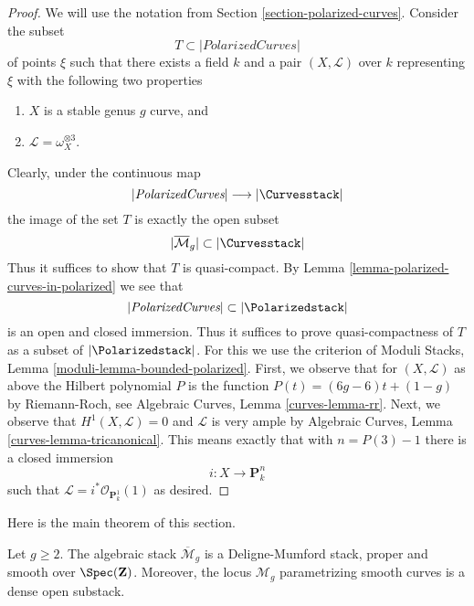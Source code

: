 \begin{proof}
We will use the notation from Section \ref{section-polarized-curves}.
Consider the subset
$$
T \subset |\textit{PolarizedCurves}|
$$
of points $\xi$ such that there exists a field $k$ and a pair
$(X, \mathcal{L})$ over $k$ representing $\xi$
with the following two properties
\begin{enumerate}
\item $X$ is a stable genus $g$ curve, and
\item $\mathcal{L} = \omega_X^{\otimes 3}$.
\end{enumerate}
Clearly, under the continuous map
$$
|\textit{PolarizedCurves}|
\longrightarrow
|\Curvesstack|
$$
the image of the set $T$ is exactly the open subset
$$
|\overline{\mathcal{M}}_g| \subset |\Curvesstack|
$$
Thus it suffices to show that $T$ is quasi-compact.
By Lemma \ref{lemma-polarized-curves-in-polarized} we see that
$$
|\textit{PolarizedCurves}| \subset |\Polarizedstack|
$$
is an open and closed immersion. Thus it suffices to
prove quasi-compactness of $T$ as a subset of
$|\Polarizedstack|$. For this we use the criterion of
Moduli Stacks, Lemma \ref{moduli-lemma-bounded-polarized}.
First, we observe that for $(X, \mathcal{L})$
as above the Hilbert polynomial $P$ is the function
$P(t) = (6g - 6)t + (1 - g)$ by Riemann-Roch, see
Algebraic Curves, Lemma \ref{curves-lemma-rr}.
Next, we observe that $H^1(X, \mathcal{L}) = 0$
and $\mathcal{L}$ is very ample by
Algebraic Curves, Lemma \ref{curves-lemma-tricanonical}.
This means exactly that with $n = P(3) - 1$
there is a closed immersion
$$
i : X \longrightarrow \mathbf{P}^n_k
$$
such that $\mathcal{L} = i^*\mathcal{O}_{\mathbf{P}^1_k}(1)$
as desired.
\end{proof}

\noindent
Here is the main theorem of this section.

\begin{theorem}
\label{theorem-stable-smooth-proper}
Let $g \geq 2$. The algebraic stack $\overline{\mathcal{M}}_g$ is a
Deligne-Mumford stack, proper and smooth over $\Spec(\mathbf{Z})$.
Moreover, the locus $\mathcal{M}_g$ parametrizing smooth curves
is a dense open substack.
\end{theorem}

